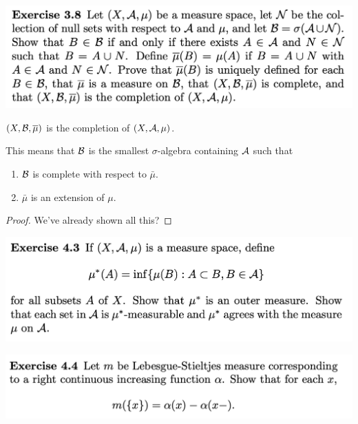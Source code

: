 \includegraphics[width=400pt]{img/analysis--berkeley-202a-hw04-c88b.png}
\begin{claim*}
  $(X, \mathcal B, \overline{\mu})$ is the completion of $(X, \mathcal A, \mu)$.

  This means that $\mathcal B$ is the smallest $\sigma$-algebra containing $\mathcal A$ such that
  \begin{enumerate}
  \item $\mathcal B$ is complete with respect to $\bar{\mu}$.
  \item $\bar{\mu}$ is an extension of $\mu$.
  \end{enumerate}
\end{claim*}

\begin{proof}
  We've already shown all this?
\end{proof}

\newpage
\begin{mdframed}
  \includegraphics[width=400pt]{img/analysis--berkeley-202a-hw-0d98.png}
\end{mdframed}


\newpage
\begin{mdframed}
\includegraphics[width=400pt]{img/analysis--berkeley-202a-hw04-c0b6.png}
\end{mdframed}

\newpage


